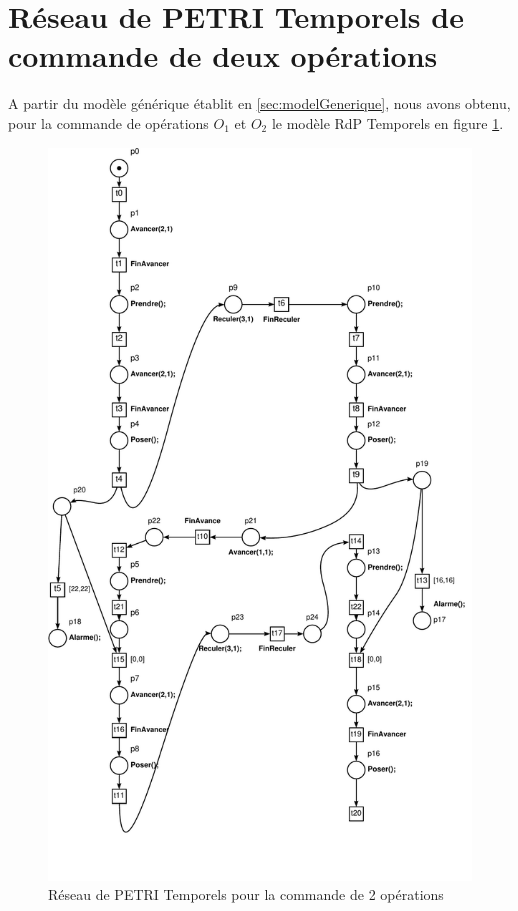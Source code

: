 \section{Réseau de PETRI Temporels de commande de deux opérations}
A partir du modèle générique établit en \ref{sec:modelGenerique}, nous avons obtenu, pour la commande de opérations $O_1$ et $O_2$ le modèle RdP Temporels en figure \ref{fig:command2Opes}.
\begin{figure}
\centering
\includegraphics[height = \textheight]{./II/images/reseau_CommandeIII-2.pdf}
\caption{Réseau de PETRI Temporels pour la commande de 2 opérations}\label{fig:command2Opes}
\end{figure}

